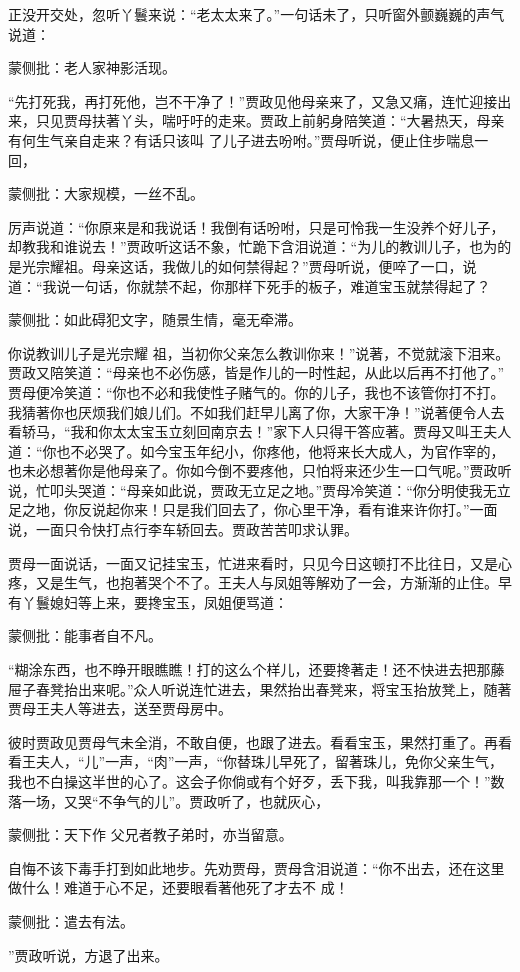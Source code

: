 \begin{parag}
    正没开交处，忽听丫鬟来说：“老太太来了。”一句话未了，只听窗外颤巍巍的声气说道：\begin{note}蒙侧批：老人家神影活现。\end{note}“先打死我，再打死他，岂不干净了！”贾政见他母亲来了，又急又痛，连忙迎接出来，只见贾母扶著丫头，喘吁吁的走来。贾政上前躬身陪笑道：“大暑热天，母亲有何生气亲自走来？有话只该叫 了儿子进去吩咐。”贾母听说，便止住步喘息一回，\begin{note}蒙侧批：大家规模，一丝不乱。\end{note}厉声说道：“你原来是和我说话！我倒有话吩咐，只是可怜我一生没养个好儿子，却教我和谁说去！”贾政听这话不象，忙跪下含泪说道：“为儿的教训儿子，也为的是光宗耀祖。母亲这话，我做儿的如何禁得起？”贾母听说，便啐了一口，说道：“我说一句话，你就禁不起，你那样下死手的板子，难道宝玉就禁得起了？\begin{note}蒙侧批：如此碍犯文字，随景生情，毫无牵滞。\end{note}你说教训儿子是光宗耀 祖，当初你父亲怎么教训你来！”说著，不觉就滚下泪来。贾政又陪笑道：“母亲也不必伤感，皆是作儿的一时性起，从此以后再不打他了。” 贾母便冷笑道：“你也不必和我使性子赌气的。你的儿子，我也不该管你打不打。我猜著你也厌烦我们娘儿们。不如我们赶早儿离了你，大家干净！”说著便令人去看轿马，“我和你太太宝玉立刻回南京去！”家下人只得干答应著。贾母又叫王夫人道：“你也不必哭了。如今宝玉年纪小，你疼他，他将来长大成人，为官作宰的，也未必想著你是他母亲了。你如今倒不要疼他，只怕将来还少生一口气呢。”贾政听说，忙叩头哭道：“母亲如此说，贾政无立足之地。”贾母冷笑道：“你分明使我无立足之地，你反说起你来！只是我们回去了，你心里干净，看有谁来许你打。”一面说，一面只令快打点行李车轿回去。贾政苦苦叩求认罪。
\end{parag}


\begin{parag}
    贾母一面说话，一面又记挂宝玉，忙进来看时，只见今日这顿打不比往日，又是心疼，又是生气，也抱著哭个不了。王夫人与凤姐等解劝了一会，方渐渐的止住。早有丫鬟媳妇等上来，要搀宝玉，凤姐便骂道：\begin{note}蒙侧批：能事者自不凡。\end{note}“糊涂东西，也不睁开眼瞧瞧！打的这么个样儿，还要搀著走！还不快进去把那藤 屉子春凳抬出来呢。”众人听说连忙进去，果然抬出春凳来，将宝玉抬放凳上，随著贾母王夫人等进去，送至贾母房中。
\end{parag}


\begin{parag}
    彼时贾政见贾母气未全消，不敢自便，也跟了进去。看看宝玉，果然打重了。再看看王夫人，“儿”一声，“肉”一声，“你替珠儿早死了，留著珠儿，免你父亲生气，我也不白操这半世的心了。这会子你倘或有个好歹，丢下我，叫我靠那一个！”数落一场，又哭“不争气的儿”。贾政听了，也就灰心，\begin{note}蒙侧批：天下作 父兄者教子弟时，亦当留意。\end{note}自悔不该下毒手打到如此地步。先劝贾母，贾母含泪说道：“你不出去，还在这里做什么！难道于心不足，还要眼看著他死了才去不 成！\begin{note}蒙侧批：遣去有法。\end{note}”贾政听说，方退了出来。
\end{parag}


